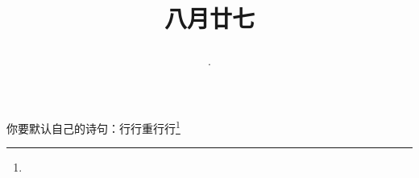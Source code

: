 \title{\date[d=29,m=9,y=2024][year:cn-y,年,month:cn,day:cn,日,·,weekday]·八月廿七 }
你要默认自己的诗句：行行重行行\footnote{ }


